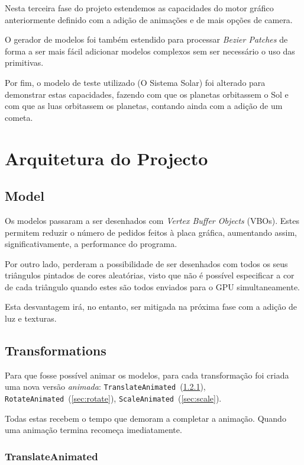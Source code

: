 \documentclass[a4paper]{article}
\begin{document}
Nesta terceira fase do projeto estendemos as capacidades do motor gráfico anteriormente definido com a adição de animações e de mais opções de camera.

O gerador de modelos foi também estendido para processar \textit{Bezier Patches} de forma a ser mais fácil adicionar modelos complexos sem ser necessário o uso das primitivas.

Por fim, o modelo de teste utilizado (O Sistema Solar) foi alterado para demonstrar estas capacidades, fazendo com que os planetas orbitassem o Sol e com que as luas orbitassem os planetas, contando ainda com a adição de um cometa.

\section{Arquitetura do Projecto}

\subsection{Model}

Os modelos passaram a ser desenhados com \textit{Vertex Buffer Objects} (VBOs). Estes permitem reduzir o número de pedidos feitos à placa gráfica, aumentando assim, significativamente, a performance do programa.

Por outro lado, perderam a possibilidade de ser desenhados com todos os seus triângulos pintados de cores aleatórias, visto que não é possível especificar a cor de cada triângulo quando estes são todos enviados para o GPU simultaneamente.

Esta desvantagem irá, no entanto, ser mitigada na próxima fase com a adição de luz e texturas.

\subsection{Transformations}

Para que fosse possível animar os modelos, para cada transformação foi criada uma nova versão \textit{animada}: \texttt{TranslateAnimated}~(\ref{sec:translate}), \texttt{RotateAnimated}~(\ref{sec:rotate}), \texttt{ScaleAnimated}~(\ref{sec:scale}).

Todas estas recebem o tempo que demoram a completar a animação. Quando uma animação termina recomeça imediatamente.

\subsubsection{TranslateAnimated}\label{sec:translate}
\end{document}
